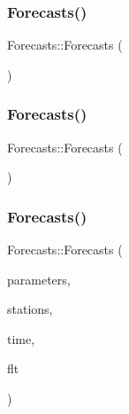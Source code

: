 \subsubsection{\texorpdfstring{Forecasts()}{Forecasts()}\hspace{0.1cm}{\footnotesize\ttfamily [1/3]}}
{\footnotesize\ttfamily Forecasts\+::\+Forecasts (\begin{DoxyParamCaption}{ }\end{DoxyParamCaption})\hspace{0.3cm}{\ttfamily [delete]}}

\mbox{\label{class_forecasts_a6f47e34b9ae9bb9496149208e3246d65}} 
\subsubsection{\texorpdfstring{Forecasts()}{Forecasts()}\hspace{0.1cm}{\footnotesize\ttfamily [2/3]}}
{\footnotesize\ttfamily Forecasts\+::\+Forecasts (\begin{DoxyParamCaption}\item[{\mbox{\hyperlink{class_forecasts}{Forecasts}} const \&}]{ }\end{DoxyParamCaption})\hspace{0.3cm}{\ttfamily [delete]}}

\mbox{\label{class_forecasts_a9a7ee86b148267a59aec821e44d5f7d9}} 
\subsubsection{\texorpdfstring{Forecasts()}{Forecasts()}\hspace{0.1cm}{\footnotesize\ttfamily [3/3]}}
{\footnotesize\ttfamily Forecasts\+::\+Forecasts (\begin{DoxyParamCaption}\item[{\mbox{\hyperlink{class_parameters}{Parameters}}}]{parameters,  }\item[{\mbox{\hyperlink{class_stations}{Stations}}}]{stations,  }\item[{\mbox{\hyperlink{class_times}{Times}}}]{time,  }\item[{\mbox{\hyperlink{class_f_l_ts}{F\+L\+Ts}}}]{flt }\end{DoxyParamCaption})}

